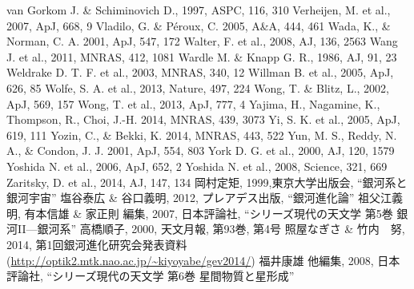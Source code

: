\begin{thebibliography}{99}
\begin{multicols}{2}
{
	van Gorkom J. \& Schiminovich D., 1997, ASPC, 116, 310
	Verheijen, M. et al., 2007, ApJ, 668, 9
    	Vladilo, G. \& P\'{e}roux, C. 2005, A\&A, 444, 461
   	Wada, K., \& Norman, C. A. 2001, ApJ, 547, 172
	Walter, F. et al., 2008, AJ, 136, 2563
	Wang J. et al., 2011, MNRAS, 412, 1081
	Wardle M. \& Knapp G. R., 1986, AJ, 91, 23
	Weldrake D. T. F. et al., 2003, MNRAS, 340, 12
	Willman B. et al., 2005, ApJ, 626, 85
	Wolfe, S. A. et al., 2013, Nature, 497, 224
	Wong, T. \& Blitz, L., 2002, ApJ, 569, 157
	Wong, T. et al., 2013, ApJ, 777, 4
   	Yajima, H., Nagamine, K., Thompson, R., Choi, J.-H. 2014, MNRAS,
   	439, 3073
	Yi, S. K. et al., 2005, ApJ, 619, 111
   	Yozin, C., \& Bekki, K. 2014, MNRAS, 443, 522
    	Yun, M. S., Reddy, N. A., \& Condon, J. J. 2001, ApJ, 554, 803
	York D. G. et al., 2000, AJ, 120, 1579
    	Yoshida N. et al., 2006, ApJ, 652, 2
   	Yoshida N. et al., 2008, Science, 321, 669
	Zaritsky, D. et al., 2014, AJ, 147, 134
	岡村定矩, 1999,東京大学出版会, ``銀河系と銀河宇宙''
	塩谷泰広 \& 谷口義明, 2012, プレアデス出版, ``銀河進化論''
	祖父江義明, 有本信雄 \& 家正則 編集, 2007, 日本評論社, ``シリーズ現代の天文学 第5巻 銀河II—銀河系''
	高橋順子, 2000, 天文月報, 第93巻, 第4号
	照屋なぎさ \& 竹内　努, 2014, 第1回銀河進化研究会発表資料(\url{http://optik2.mtk.nao.ac.jp/~kiyoyabe/gev2014/})
	福井康雄 他編集, 2008, 日本評論社, ``シリーズ現代の天文学 第6巻 星間物質と星形成''
}
\end{multicols}
\end{thebibliography}

%
